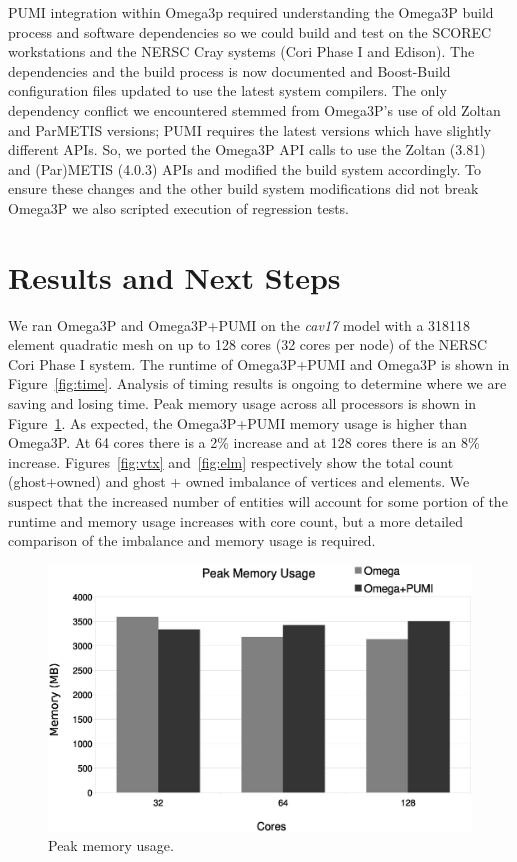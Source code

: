 \documentclass[a4paper]{article}
\begin{document}
PUMI integration within Omega3p required understanding the Omega3P build process
and software dependencies so we could build and test on the SCOREC workstations
and the NERSC Cray systems (Cori Phase I and Edison).
The dependencies and the build process is now documented and Boost-Build
configuration files updated to use the latest system compilers.
The only dependency conflict we encountered stemmed from Omega3P's use of old
Zoltan and ParMETIS versions; PUMI requires the latest versions which have
slightly different APIs.
So, we ported the Omega3P API calls to use the Zoltan (3.81) and
(Par)METIS (4.0.3) APIs and modified the build system accordingly.
To ensure these changes and the other build system modifications did not break
Omega3P we also scripted execution of regression tests.

\section{Results and Next Steps}

We ran Omega3P and Omega3P+PUMI on the \textit{cav17} model with a 318118
element quadratic mesh on up to 128 cores (32 cores per node) of the NERSC Cori
Phase I system.
The runtime of Omega3P+PUMI and Omega3P is shown in Figure~\ref{fig:time}.
Analysis of timing results is ongoing to determine where we are saving and
losing time.
Peak memory usage across all processors is shown in
Figure~\ref{fig:memusage}.
As expected, the Omega3P+PUMI memory usage is higher than Omega3P.
At 64 cores there is a 2\% increase and at 128 cores there is an 8\% increase.
Figures~\ref{fig:vtx} and~\ref{fig:elm} respectively show the total count
(ghost+owned) and ghost + owned imbalance of vertices and
elements.
We suspect that the increased number of entities will account for some portion
of the runtime and memory usage increases with core count, but a more detailed
comparison of the imbalance and memory usage is required.

\begin{figure}[ht]
\centering
  \includegraphics[width=\textwidth]{peak-memory-usage.eps}
  \caption{\label{fig:memusage} Peak memory usage.}
\end{figure}
\end{document}
